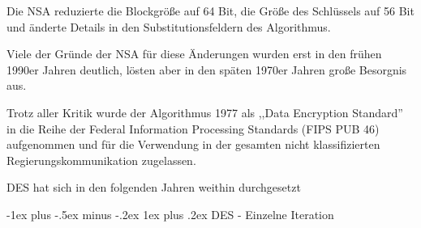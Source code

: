 \documentclass[a4paper]{article}
\makeatletter
\renewcommand{\subsubsection}{\@startsection{subsubsection}{3}{0mm}%
 {-1ex plus -.5ex minus -.2ex}%
 {1ex plus .2ex}%
 {\normalfont\small\bfseries}}
\makeatother
\begin{document}
\begin{multicols}{3}
\begin{itemize*}
\begin{itemize*}
                  \item Die NSA reduzierte die Blockgröße auf 64 Bit, die Größe des Schlüssels auf 56 Bit und änderte Details in den Substitutionsfeldern des Algorithmus.
                  \item Viele der Gründe der NSA für diese Änderungen wurden erst in den frühen 1990er Jahren deutlich, lösten aber in den späten 1970er Jahren große Besorgnis aus.
            \end{itemize*}
            \item Trotz aller Kritik wurde der Algorithmus 1977 als ,,Data Encryption
            Standard'' in die Reihe der Federal Information Processing Standards
            (FIPS PUB 46) aufgenommen und für die Verwendung in der gesamten nicht
            klassifizierten Regierungskommunikation zugelassen.
            \item DES hat sich in den folgenden Jahren weithin durchgesetzt
      \end{itemize*}




      \subsubsection{DES - Einzelne
            Iteration}


\end{multicols}
\end{document}
